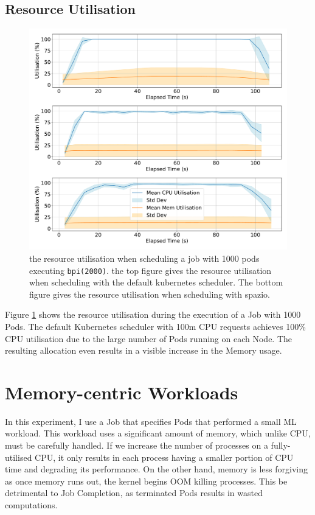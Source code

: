 \subsection{Resource Utilisation}
\begin{figure}[h]
    \centering
    \includegraphics[width=\textwidth]{images/pi-util.pdf}
    \caption{the resource utilisation when scheduling a job with 1000 pods
    executing \texttt{bpi(2000)}. the top figure gives the resource utilisation
    when scheduling with the default kubernetes scheduler. The bottom figure
    gives the resource utilisation when scheduling with spazio.}
    \label{fig:pi-2000-1000x-pod-util}
\end{figure}

Figure \ref{fig:pi-2000-1000x-pod-util} shows the resource utilisation during
the execution of a Job with 1000 Pods. The default Kubernetes scheduler with
100m CPU requests achieves 100\% CPU utilisation due to the large number of Pods
running on each Node. The resulting allocation even results in a visible
increase in the Memory usage.

\section{Memory-centric Workloads}
\label{sec:eval-mem-centric}
In this experiment, I use a Job that specifies Pods that performed a small ML
workload. This workload uses a significant amount of memory, which unlike CPU,
must be carefully handled. If we increase the number of processes on a
fully-utilised CPU, it only results in each process having a smaller portion of
CPU time and degrading its performance. On the other hand, memory is less
forgiving as once memory runs out, the kernel begins OOM killing processes. This
be detrimental to Job Completion, as terminated Pods results in wasted
computations.

